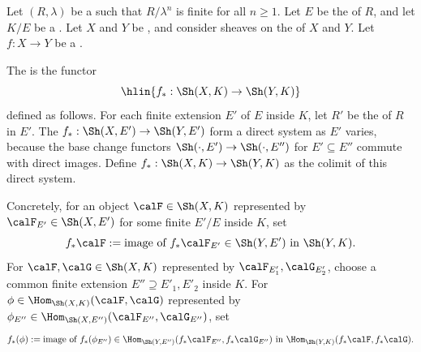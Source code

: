 \begin{definition} \label{definition:direct_image_functor_on_etale_sheaves_with_algebraic_adic_coefficients_on_a_noetherian_scheme}
Let $(R, \lambda)$ be a   such that $R/\lambda^n$ is finite for all $n \geq 1$. Let $E$ be the  of $R$, and let $K/E$ be a . Let $X$ and $Y$ be , and consider sheaves on the  of $X$ and $Y$. Let $f: X \to Y$ be a .

The  is the functor
$$\hlin{f_* : \Sh(X, K) \to \Sh(Y, K)}$$
defined as follows. For each finite extension $E'$ of $E$ inside $K$, let $R'$ be the  of $R$ in $E'$. The  $f_*: \Sh(X, E') \to \Sh(Y, E')$ form a direct system as $E'$ varies, because the base change functors $\Sh(\cdot, E') \to \Sh(\cdot, E'')$ for $E' \subseteq E''$ commute with direct images. Define $f_*: \Sh(X, K) \to \Sh(Y, K)$ as the colimit of this direct system.

Concretely, for an object $\calF \in \Sh(X, K)$ represented by $\calF_{E'} \in \Sh(X, E')$ for some finite $E'/E$ inside $K$, set
$$f_* \calF := \text{image of } f_* \calF_{E'} \in \Sh(Y, E') \text{ in } \Sh(Y, K).$$
For $\calF, \calG \in \Sh(X, K)$ represented by $\calF_{E'_1}, \calG_{E'_2}$, choose a common finite extension $E'' \supseteq E'_1, E'_2$ inside $K$. For $\phi \in \Hom_{\Sh(X, K)}(\calF, \calG)$ represented by $\phi_{E''} \in \Hom_{\Sh(X, E'')}(\calF_{E''}, \calG_{E''})$, set
$$f_* (\phi) := \text{image of } f_*(\phi_{E''}) \in \Hom_{\Sh(Y, E'')}(f_* \calF_{E''}, f_* \calG_{E''}) \text{ in } \Hom_{\Sh(Y, K)}(f_* \calF, f_* \calG).$$
\end{definition}
